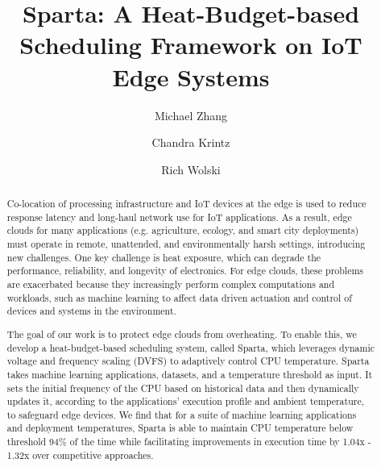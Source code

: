 \documentclass[runningheads]{llncs}
\begin{document}
%

\title{Sparta: A Heat-Budget-based Scheduling Framework on IoT Edge Systems}

%
%


\author{Michael Zhang \and
Chandra Krintz \and
Rich Wolski}


%
\maketitle              %
%


\begin{abstract}
Co-location of processing infrastructure and IoT devices at the edge is used to reduce response latency and long-haul network use for IoT applications. As a result, edge clouds for many applications (e.g. agriculture, ecology, and smart city deployments) must operate in remote, unattended, and environmentally harsh settings, introducing new challenges. One key challenge is heat exposure, which can degrade the performance, reliability, and longevity of electronics. For edge clouds, these problems are exacerbated because they increasingly perform complex computations and workloads, such as machine learning to affect data driven actuation and control of devices and systems in the environment.

\vspace{0.08in}
The goal of our work is to protect edge clouds from overheating. To enable this, we develop a heat-budget-based scheduling system, called Sparta, which leverages dynamic voltage and frequency scaling (DVFS) to adaptively control CPU temperature. Sparta takes machine learning applications, datasets, and a temperature threshold as input. It sets the initial frequency of the CPU based on historical data and then dynamically updates it, according to the applications' execution  profile and ambient temperature, to safeguard edge devices. We find that for a suite of machine learning applications and deployment temperatures, Sparta is able to maintain CPU temperature below threshold 94\% of the time while facilitating improvements in execution time by 1.04x - 1.32x over competitive approaches.


\end{abstract}
%
%
%
\end{document}
